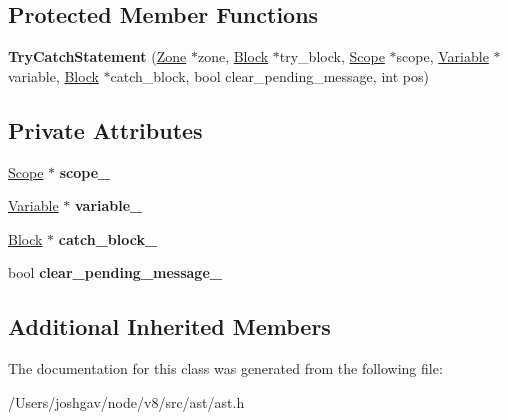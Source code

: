 \subsection*{Protected Member Functions}
\begin{DoxyCompactItemize}
\item 
{\bfseries Try\+Catch\+Statement} (\hyperlink{classv8_1_1internal_1_1_zone}{Zone} $\ast$zone, \hyperlink{classv8_1_1internal_1_1_block}{Block} $\ast$try\+\_\+block, \hyperlink{classv8_1_1internal_1_1_scope}{Scope} $\ast$scope, \hyperlink{classv8_1_1internal_1_1_variable}{Variable} $\ast$variable, \hyperlink{classv8_1_1internal_1_1_block}{Block} $\ast$catch\+\_\+block, bool clear\+\_\+pending\+\_\+message, int pos)\hypertarget{classv8_1_1internal_1_1_try_catch_statement_ade79e9537bdfdab6915ae7f311002ce8}{}\label{classv8_1_1internal_1_1_try_catch_statement_ade79e9537bdfdab6915ae7f311002ce8}

\end{DoxyCompactItemize}
\subsection*{Private Attributes}
\begin{DoxyCompactItemize}
\item 
\hyperlink{classv8_1_1internal_1_1_scope}{Scope} $\ast$ {\bfseries scope\+\_\+}\hypertarget{classv8_1_1internal_1_1_try_catch_statement_a51d0316ff768e2a11e27b7dc30ca5119}{}\label{classv8_1_1internal_1_1_try_catch_statement_a51d0316ff768e2a11e27b7dc30ca5119}

\item 
\hyperlink{classv8_1_1internal_1_1_variable}{Variable} $\ast$ {\bfseries variable\+\_\+}\hypertarget{classv8_1_1internal_1_1_try_catch_statement_a4171b815ab4676c2e23364408000cc77}{}\label{classv8_1_1internal_1_1_try_catch_statement_a4171b815ab4676c2e23364408000cc77}

\item 
\hyperlink{classv8_1_1internal_1_1_block}{Block} $\ast$ {\bfseries catch\+\_\+block\+\_\+}\hypertarget{classv8_1_1internal_1_1_try_catch_statement_a32e46017cf1de2b0d248ea4c8259c988}{}\label{classv8_1_1internal_1_1_try_catch_statement_a32e46017cf1de2b0d248ea4c8259c988}

\item 
bool {\bfseries clear\+\_\+pending\+\_\+message\+\_\+}\hypertarget{classv8_1_1internal_1_1_try_catch_statement_a6e39230110a1db0f51b7bd52382ca3e0}{}\label{classv8_1_1internal_1_1_try_catch_statement_a6e39230110a1db0f51b7bd52382ca3e0}

\end{DoxyCompactItemize}
\subsection*{Additional Inherited Members}


The documentation for this class was generated from the following file\+:\begin{DoxyCompactItemize}
\item 
/\+Users/joshgav/node/v8/src/ast/ast.\+h\end{DoxyCompactItemize}
